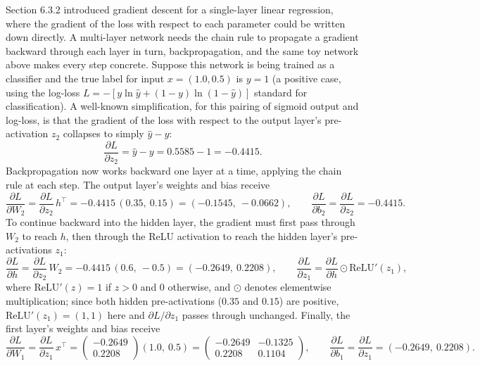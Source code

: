 \documentclass[../ai_in_finance]{subfiles}
\begin{document}
Section 6.3.2 introduced gradient descent for a single-layer linear regression, where the gradient of the loss with respect to each parameter could be written down directly. A multi-layer network needs the chain rule to propagate a gradient backward through each layer in turn, backpropagation, and the same toy network above makes every step concrete. Suppose this network is being trained as a classifier and the true label for input $x=(1.0,0.5)$ is $y=1$ (a positive case, using the log-loss $L=-[y\ln\hat y+(1-y)\ln(1-\hat y)]$ standard for classification). A well-known simplification, for this pairing of sigmoid output and log-loss, is that the gradient of the loss with respect to the output layer's pre-activation $z_2$ collapses to simply $\hat y - y$:
\begin{equation*}
\frac{\partial L}{\partial z_2} = \hat y - y = 0.5585 - 1 = -0.4415.
\end{equation*}
Backpropagation now works backward one layer at a time, applying the chain rule at each step. The output layer's weights and bias receive
\begin{equation*}
\frac{\partial L}{\partial W_2} = \frac{\partial L}{\partial z_2}\, h^\top = -0.4415\,(0.35,\ 0.15) = (-0.1545,\ -0.0662), \qquad \frac{\partial L}{\partial b_2} = \frac{\partial L}{\partial z_2} = -0.4415.
\end{equation*}
To continue backward into the hidden layer, the gradient must first pass through $W_2$ to reach $h$, then through the ReLU activation to reach the hidden layer's pre-activations $z_1$:
\begin{equation*}
\frac{\partial L}{\partial h} = \frac{\partial L}{\partial z_2}\,W_2 = -0.4415\,(0.6,\ -0.5) = (-0.2649,\ 0.2208), \qquad \frac{\partial L}{\partial z_1} = \frac{\partial L}{\partial h} \odot \text{ReLU}'(z_1),
\end{equation*}
where $\text{ReLU}'(z)=1$ if $z>0$ and $0$ otherwise, and $\odot$ denotes elementwise multiplication; since both hidden pre-activations ($0.35$ and $0.15$) are positive, $\text{ReLU}'(z_1)=(1,1)$ here and $\partial L/\partial z_1$ passes through unchanged. Finally, the first layer's weights and bias receive
\begin{equation*}
\frac{\partial L}{\partial W_1} = \frac{\partial L}{\partial z_1}\,x^\top = \begin{pmatrix} -0.2649 \\ 0.2208 \end{pmatrix}(1.0,\ 0.5) = \begin{pmatrix} -0.2649 & -0.1325 \\ 0.2208 & 0.1104 \end{pmatrix}, \qquad \frac{\partial L}{\partial b_1} = \frac{\partial L}{\partial z_1} = (-0.2649,\ 0.2208).
\end{equation*}
\end{document}
